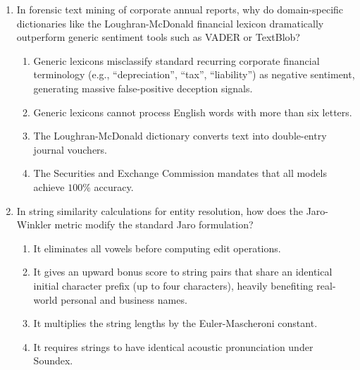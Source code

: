 \begin{enumerate}[label=\textbf{MCQ 11.\arabic*}]
    \item In forensic text mining of corporate annual reports, why do domain-specific dictionaries like the Loughran-McDonald financial lexicon dramatically outperform generic sentiment tools such as VADER or TextBlob?
    \begin{enumerate}[label=(\alph*)]
        \item Generic lexicons misclassify standard recurring corporate financial terminology (e.g., ``depreciation'', ``tax'', ``liability'') as negative sentiment, generating massive false-positive deception signals.
        \item Generic lexicons cannot process English words with more than six letters.
        \item The Loughran-McDonald dictionary converts text into double-entry journal vouchers.
        \item The Securities and Exchange Commission mandates that all models achieve $100\%$ accuracy.
    \end{enumerate}

    \item In string similarity calculations for entity resolution, how does the Jaro-Winkler metric modify the standard Jaro formulation?
    \begin{enumerate}[label=(\alph*)]
        \item It eliminates all vowels before computing edit operations.
        \item It gives an upward bonus score to string pairs that share an identical initial character prefix (up to four characters), heavily benefiting real-world personal and business names.
        \item It multiplies the string lengths by the Euler-Mascheroni constant.
        \item It requires strings to have identical acoustic pronunciation under Soundex.
    \end{enumerate}
\end{enumerate}
